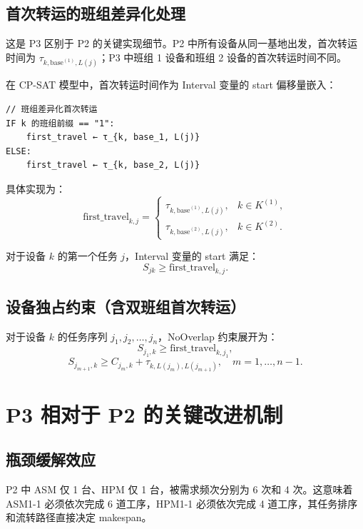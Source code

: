 \documentclass[UTF8,a4paper,12pt]{ctexart}
\begin{document}
\subsection{首次转运的班组差异化处理}
这是 P3 区别于 P2 的关键实现细节。P2 中所有设备从同一基地出发，首次转运时间为 $\tau_{k, \text{base}^{(1)}, L(j)}$；P3 中班组 1 设备和班组 2 设备的首次转运时间不同。

在 CP-SAT 模型中，首次转运时间作为 Interval 变量的 start 偏移量嵌入：
\begin{verbatim}
// 班组差异化首次转运
IF k 的班组前缀 == "1":
    first_travel ← τ_{k, base_1, L(j)}
ELSE:
    first_travel ← τ_{k, base_2, L(j)}
\end{verbatim}

具体实现为：
\begin{equation}
\text{first\_travel}_{k,j} = \begin{cases} \tau_{k, \text{base}^{(1)}, L(j)}, & k \in K^{(1)}, \\ \tau_{k, \text{base}^{(2)}, L(j)}, & k \in K^{(2)}. \end{cases} \tag{9-3}
\end{equation}

对于设备 $k$ 的第一个任务 $j$，Interval 变量的 start 满足：
\begin{equation}
S_{jk} \geq \text{first\_travel}_{k,j}. \tag{9-4}
\end{equation}

\subsection{设备独占约束（含双班组首次转运）}
对于设备 $k$ 的任务序列 $j_1, j_2, \ldots, j_n$，NoOverlap 约束展开为：
\begin{equation}
S_{j_1, k} \geq \text{first\_travel}_{k,j_1}, \tag{9-5}
\end{equation}
\begin{equation}
S_{j_{m+1},k} \geq C_{j_m, k} + \tau_{k, L(j_m), L(j_{m+1})}, \quad m = 1, \ldots, n-1. \tag{9-6}
\end{equation}

\section{P3 相对于 P2 的关键改进机制}
\subsection{瓶颈缓解效应}
P2 中 ASM 仅 1 台、HPM 仅 1 台，被需求频次分别为 6 次和 4 次。这意味着 ASM1-1 必须依次完成 6 道工序，HPM1-1 必须依次完成 4 道工序，其任务排序和流转路径直接决定 makespan。
\end{document}
